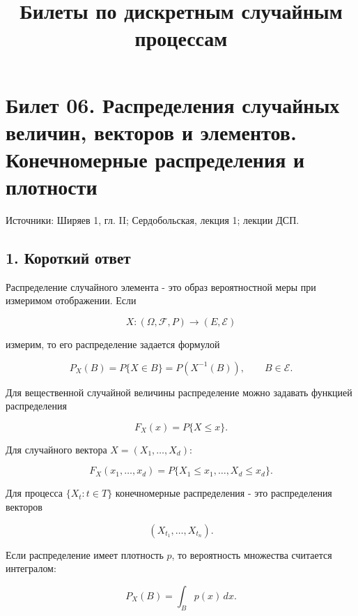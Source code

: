 \documentclass[
  11pt,
  a4paper,
]{article}
\title{Билеты по дискретным случайным процессам}
\author{}
\date{}
\begin{document}
\maketitle

\section{Билет 06. Распределения случайных величин, векторов и
элементов. Конечномерные распределения и
плотности}\label{ux431ux438ux43bux435ux442-06.-ux440ux430ux441ux43fux440ux435ux434ux435ux43bux435ux43dux438ux44f-ux441ux43bux443ux447ux430ux439ux43dux44bux445-ux432ux435ux43bux438ux447ux438ux43d-ux432ux435ux43aux442ux43eux440ux43eux432-ux438-ux44dux43bux435ux43cux435ux43dux442ux43eux432.-ux43aux43eux43dux435ux447ux43dux43eux43cux435ux440ux43dux44bux435-ux440ux430ux441ux43fux440ux435ux434ux435ux43bux435ux43dux438ux44f-ux438-ux43fux43bux43eux442ux43dux43eux441ux442ux438}

Источники: Ширяев 1, гл. II; Сердобольская, лекция 1; лекции ДСП.

\subsection{1. Короткий
ответ}\label{ux43aux43eux440ux43eux442ux43aux438ux439-ux43eux442ux432ux435ux442}

Распределение случайного элемента - это образ вероятностной меры при
измеримом отображении. Если

\[
X:(\Omega,\mathcal F,P)\to(E,\mathcal E)
\]

измерим, то его распределение задается формулой

\[
P_X(B)=P\{X\in B\}=P(X^{-1}(B)),\qquad B\in\mathcal E.
\]

Для вещественной случайной величины распределение можно задавать
функцией распределения

\[
F_X(x)=P\{X\le x\}.
\]

Для случайного вектора \(X=(X_1,\ldots,X_d)\):

\[
F_X(x_1,\ldots,x_d)=P\{X_1\le x_1,\ldots,X_d\le x_d\}.
\]

Для процесса \(\{X_t:t\in T\}\) конечномерные распределения - это
распределения векторов

\[
(X_{t_1},\ldots,X_{t_n}).
\]

Если распределение имеет плотность \(p\), то вероятность множества
считается интегралом:

\[
P_X(B)=\int_B p(x)\,dx.
\]
\end{document}
